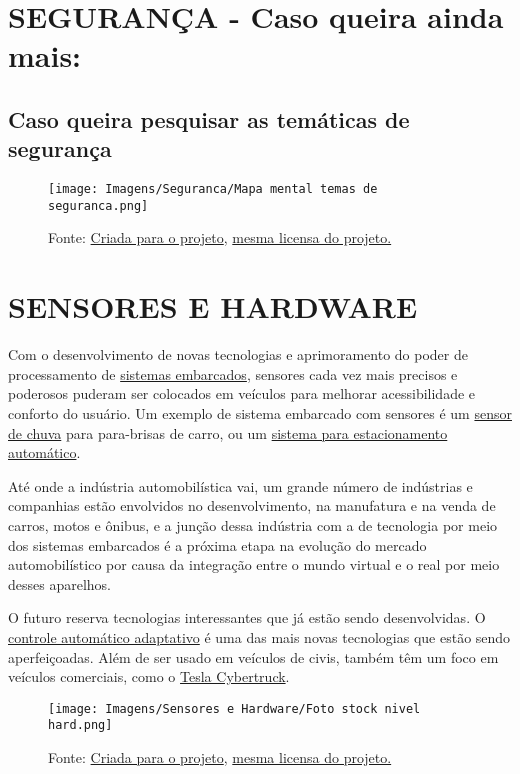 \documentclass{article}
\begin{document}
\newpage

\section*{SEGURANÇA - Caso queira ainda mais:}
\subsection*{Caso queira pesquisar as temáticas de segurança}


\begin{figure}[ht]
    \centering
    \texttt{[image: Imagens/Seguranca/Mapa mental temas de seguranca.png]}
    \caption{Fonte: \href{https://github.com/solid-titans/LDO-Embarcados-Veiculares}{Criada para o projeto}, \href{https://github.com/solid-titans/LDO-Embarcados-Veiculares/blob/main/LICENSE}{mesma licensa do projeto.}}
\end{figure}


\newpage


\section*{SENSORES E HARDWARE}

\hspace{4pt} Com o desenvolvimento de novas tecnologias e aprimoramento do poder de processamento de \href{https://pt.wikipedia.org/wiki/Sistema_embarcado}{sistemas embarcados}, sensores cada vez mais precisos e poderosos puderam ser colocados em veículos para melhorar acessibilidade e conforto do usuário. Um exemplo de sistema embarcado com sensores é um \href{https://www.youtube.com/watch?v=AxapuVgepV8}{sensor de chuva} para para-brisas de carro, ou um \href{https://www.youtube.com/watch?v=EppMSSYBOm0}{sistema para estacionamento automático}. 

Até onde a indústria automobilística vai, um grande número de indústrias e companhias estão envolvidos no desenvolvimento, na manufatura e na venda de carros, motos e ônibus, e a junção dessa indústria com a de tecnologia por meio dos sistemas embarcados é a próxima etapa na evolução  do mercado automobilístico por causa da integração entre o mundo virtual e o real por meio desses aparelhos.

O futuro reserva tecnologias interessantes que já estão sendo desenvolvidas. O \href{https://www.youtube.com/watch?v=j7XKgLtTN2o}{controle automático adaptativo} é uma das mais novas tecnologias que estão sendo aperfeiçoadas. Além de ser usado em veículos de civis, também têm um foco em veículos comerciais, como o \href{https://external-content.duckduckgo.com/iu/?u=https%3A%2F%2Fcdn.cnn.com%2Fcnnnext%2Fdam%2Fassets%2F191121212606-tesla-cybertruck-exlarge-169.jpg&f=1&nofb=1}{Tesla Cybertruck}.


\begin{figure}[ht]
    \centering
    \texttt{[image: Imagens/Sensores e Hardware/Foto stock nivel hard.png]}
    \caption{Fonte: \href{https://github.com/solid-titans/LDO-Embarcados-Veiculares}{Criada para o projeto}, \href{https://github.com/solid-titans/LDO-Embarcados-Veiculares/blob/main/LICENSE}{mesma licensa do projeto.}}
\end{figure}


\newpage
\end{document}
